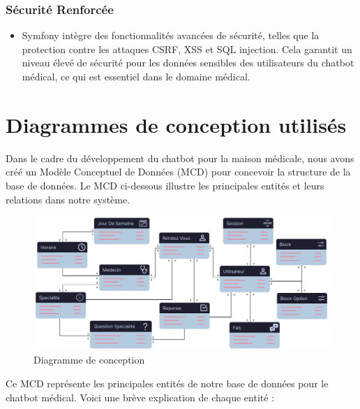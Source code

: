 \subsubsection{Sécurité Renforcée}

\begin{itemize}
  \item Symfony intègre des fonctionnalités avancées de sécurité, telles que la protection contre les attaques CSRF, XSS et SQL injection. Cela garantit un niveau élevé de sécurité pour les données sensibles des utilisateurs du chatbot médical, ce qui est essentiel dans le domaine médical.
\end{itemize}


\section{Diagrammes de conception utilisés}

\hspace{16pt}Dans le cadre du développement du chatbot pour la maison médicale, nous avons créé un Modèle Conceptuel de Données (MCD) pour concevoir la structure de la base de données. Le MCD ci-dessous illustre les principales entités et leurs relations dans notre système.\\


\begin{figure}[H] 
    \centering
    \includegraphics[scale=0.67]{Figures/MCDpre.png}
    \caption{Diagramme de conception}
    \label{entite} %
\end{figure}

Ce MCD représente les principales entités de notre base de données pour le chatbot médical. Voici une brève explication de chaque entité :


